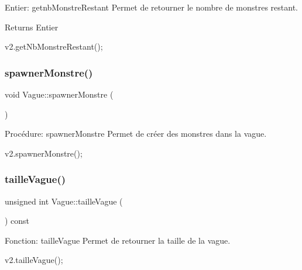 Entier\+: getnb\+Monstre\+Restant Permet de retourner le nombre de monstres restant. 

\begin{DoxyReturn}{Returns}
Entier 
\begin{DoxyCode}
v2.getNbMonstreRestant();
\end{DoxyCode}
 
\end{DoxyReturn}
\mbox{\label{classVague_a0cfa903ba06db46ba3d45ceae6a89052}} 
\subsubsection{\texorpdfstring{spawner\+Monstre()}{spawnerMonstre()}}
{\footnotesize\ttfamily void Vague\+::spawner\+Monstre (\begin{DoxyParamCaption}{ }\end{DoxyParamCaption})}



Procédure\+: spawner\+Monstre Permet de créer des monstres dans la vague. 


\begin{DoxyCode}
v2.spawnerMonstre();
\end{DoxyCode}
 \mbox{\label{classVague_a00fd363241fbfd6ed6819d408155a6ee}} 
\subsubsection{\texorpdfstring{taille\+Vague()}{tailleVague()}}
{\footnotesize\ttfamily unsigned int Vague\+::taille\+Vague (\begin{DoxyParamCaption}{ }\end{DoxyParamCaption}) const}



Fonction\+: taille\+Vague Permet de retourner la taille de la vague. 


\begin{DoxyCode}
v2.tailleVague();
\end{DoxyCode}
 \mbox{\label{classVague_aaa31d3deb82c73be899c478a55a6724f}} 
